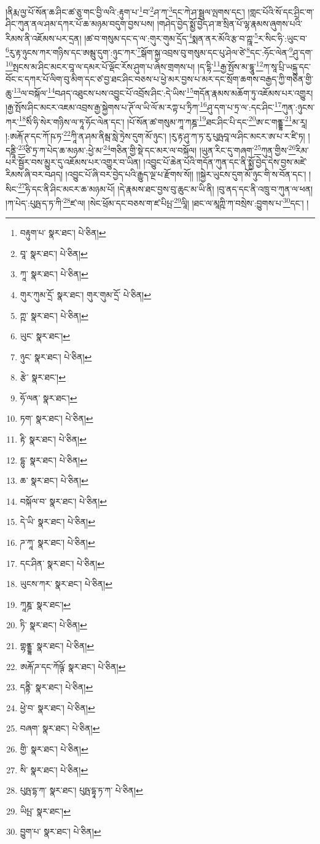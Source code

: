 །ནིརྨ་ལྱ་པོ་སོན་ཆ་ཤིང་ཚ་ཅུ་གང་བྱི་ལའི་:རྟུག་པ་\footnote{བརྟུག་པ་  སྣར་ཐང་།  པེ་ཅིན། }བ་\footnote{བཱ་  སྣར་ཐང་།  པེ་ཅིན། }ཤ་ཀ་\footnote{ཀཱ་  སྣར་ཐང་།  པེ་ཅིན། }དང་ཀེ་ཤ་སྦྲུལ་ལྤགས་དང་། །གླང་པོའི་སོ་དང་ཤྲིང་ག་ཤིང་ཀུན་ནལ་ཤམ་དཀར་པོ་ཆ་མཉམ་བདུག་བྱས་པས། །གཤེད་བྱེད་སྨྱོ་བྱེད་ཤ་ཟ་སྲིན་པོ་ལྷ་རྣམས་ཞུགས་པའི་རིམས་ནི་འཇོམས་པར་དྲན། །ཚ་བ་གསུམ་དང་ད་ལ་:གུར་གུམ་དྲོད་\footnote{གུར་ཀུམ་དྲོ་  སྣར་ཐང་། གུར་གུམ་དྲོ་  པེ་ཅིན། }སྨན་ནར་མོའི་རྩ་བ་ཀྵཱ་\footnote{ཀྵ་  སྣར་ཐང་།  པེ་ཅིན། }ར་སིང་ཧི་:ཡུང་བ་\footnote{ཡུང་  སྣར་ཐང་། }རུ་རྟ་ཉུངས་ཀར་གཉིས་དང་ཨམྦུ་དུག་:ཉུང་ཀར་\footnote{ཉུང་  སྣར་ཐང་།  པེ་ཅིན། }སྒོག་སྐྱ་འབྲས་བུ་གསུམ་དང་པུ་ཤེལ་ཙེ་\footnote{རྩེ་  སྣར་ཐང་། }དང་:ཧོང་ལེན་\footnote{ཧོ་ལན་  སྣར་ཐང་། }ཤུ་དག་\footnote{ཏག་  སྣར་ཐང་།  པེ་ཅིན། }སྤངས་མ་ཤིང་མངར་བཱ་ལ་དམར་པོ་ལྡོང་རོས་ཤུག་པ་ཞེས་གྲགས་པ། །ད་དྷི་\footnote{རྟི་  སྣར་ཐང་།  པེ་ཅིན། }རྒྱ་སྤོས་མ་དྷཱུ་\footnote{དྷུ་  སྣར་ཐང་།  པེ་ཅིན། }ཀ་སཱ་པྲི་ཡངྐུ་དང་བོང་ང་དཀར་པོ་ལིག་བུ་མིག་དང་ཙ་བྱ་ཐང་ཤིང་བཅས་པ་ཕྱེ་མར་བྱས་པ་མར་དང་སྲོག་ཆགས་བརྒྱད་ཀྱི་གཅིན་གྱི་ཆུ་\footnote{ཆ་  སྣར་ཐང་།  པེ་ཅིན། }ལ་བསྐོལ་\footnote{བསྐོལ་བ་  སྣར་ཐང་།  པེ་ཅིན། }བཤད་འཐུངས་པས་འབྱུང་པོ་འབྲོས་ཤིང་:དེ་ཡིས་\footnote{དེ་ཡི་  སྣར་ཐང་།  པེ་ཅིན། }གདོན་རྣམས་མཆོག་ཏུ་འཇོམས་པར་འགྱུར། །རྒྱ་སྤོས་ཤིང་མངར་འཇམ་འབྲས་རྒྱ་སྐྱེགས་པ་ཊོ་ལ་ཡི་ལོ་མ་རཀྟ་པ་ཏྲིཀ་\footnote{ཌ་ཀཱ་  སྣར་ཐང་།  པེ་ཅིན། }ཤུ་དག་པ་ཏྲ་ལ་:དང་ཤིང་\footnote{དང་ཤིན་  སྣར་ཐང་།  པེ་ཅིན། }ཀུན་:ཉུངས་ཀར་\footnote{ཡུངས་ཀར་  སྣར་ཐང་།  པེ་ཅིན། }སིཾ་ཧི་སེར་གཉིས་ལ་ཏཱ་ཧོང་ལེན་དང་། །པོ་སོན་ཚ་གསུམ་ཀཱ་ཀཎྜ་\footnote{ཀཱཎྜ་  སྣར་ཐང་། }ཐང་ཤིང་པི་དང་\footnote{ཏི་  སྣར་ཐང་།  པེ་ཅིན། }ཨ་ང་གནྡྷ་\footnote{གྷནྡྷ་  སྣར་ཐང་།  པེ་ཅིན། }མ་རཱ། །:ཨརྐོ་ཊ་དང་ཀོ་ཥ་ཏ་\footnote{ཨརྐོ་ཌ་དང་ཀོཥྚོ་  སྣར་ཐང་།  པེ་ཅིན། }ཀཱི་ན་ཤམ་ནིམྦ་སླེ་ཏྲེས་དུག་མོ་ཉུང་། །རུ་རྟ་ཤུ་ཀ་ཏ་རུ་པུཥྤབཱ་ལ་ཤིང་མངར་ཨ་པ་ར་ཛི་ཏ། །དནྡཱི་\footnote{དནྟི་  སྣར་ཐང་།  པེ་ཅིན། }ཙི་ཏྲ་ཀ་པེད་ཆ་མཉམ་:ཕྱེ་མ་\footnote{ཕྱེ་བ་  སྣར་ཐང་།  པེ་ཅིན། }གཅིན་གྱི་སྡེ་དང་མར་ལ་བསྐོལ། །ཡུན་རིང་དུ་གཞག་\footnote{བཞག་  སྣར་ཐང་།  པེ་ཅིན། }ཀུན་གྱིས་\footnote{གྱི་  སྣར་ཐང་།  པེ་ཅིན། }རིམ་པར་སྦྱོར་བས་མྱུར་དུ་འཇོམས་པར་འགྱུར་བ་ཡིན། །འབྱུང་པོ་ཆེན་པོའི་གདོན་ཀུན་དང་ནི་སྨྱོ་བྱེད་དེས་བྱས་མཛེ་རིམས་ཞི་བར་བཤད། །འབྱུང་པོ་ཞི་བར་བྱེད་པའི་རྒྱུད་ལྔ་པ་རྫོགས་སོ།། །།སྐྱེར་ཡུངས་དུག་མོ་ཉུང་གི་ས་བོན་དང་། །སིང་\footnote{སི་  སྣར་ཐང་།  པེ་ཅིན། }ཧི་དང་ནི་ཤིང་མངར་ཆ་མཉམ་པོ། །དེ་རྣམས་ཐང་བྱས་བུ་ཆུང་མ་ཡི་ནི། །བུ་ནད་དང་ནི་འཁྲུ་བ་ཀུན་ལ་ཕན། །ཀ་པེད་:པུཥྤ་ད་ཏ་ཀི་\footnote{པུཥྤ་དྷ་ཀ་  སྣར་ཐང་། པུཥྤ་དྷཱ་ཏ་ཀ་  པེ་ཅིན། }ཛ་ལ། །སེང་ཕྲོམ་དང་བཅས་ག་ཛ་པིཔྤ་\footnote{ཡིཔྤ་  སྣར་ཐང་། }ལཱི། །ཐང་ལ་མཱཀྵི་ཀ་བསྲེས་:བྱུགས་པ་\footnote{བྱུག་པ་  སྣར་ཐང་།  པེ་ཅིན། }དང་། །
